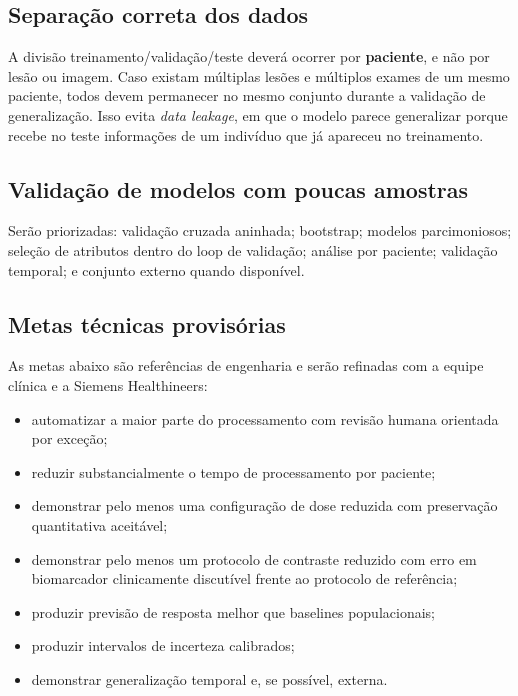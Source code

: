 \documentclass[11pt,a4paper]{article}
\begin{document}
\subsection{Separação correta dos dados}

A divisão treinamento/validação/teste deverá ocorrer por \textbf{paciente}, e não por lesão ou imagem. Caso existam múltiplas lesões e múltiplos exames de um mesmo paciente, todos devem permanecer no mesmo conjunto durante a validação de generalização. Isso evita \emph{data leakage}, em que o modelo parece generalizar porque recebe no teste informações de um indivíduo que já apareceu no treinamento.

\subsection{Validação de modelos com poucas amostras}

Serão priorizadas: validação cruzada aninhada; bootstrap; modelos parcimoniosos; seleção de atributos dentro do loop de validação; análise por paciente; validação temporal; e conjunto externo quando disponível.

\subsection{Metas técnicas provisórias}

As metas abaixo são referências de engenharia e serão refinadas com a equipe clínica e a Siemens Healthineers:

\begin{itemize}
\item automatizar a maior parte do processamento com revisão humana orientada por exceção;
\item reduzir substancialmente o tempo de processamento por paciente;
\item demonstrar pelo menos uma configuração de dose reduzida com preservação quantitativa aceitável;
\item demonstrar pelo menos um protocolo de contraste reduzido com erro em biomarcador clinicamente discutível frente ao protocolo de referência;
\item produzir previsão de resposta melhor que baselines populacionais;
\item produzir intervalos de incerteza calibrados;
\item demonstrar generalização temporal e, se possível, externa.
\end{itemize}
\end{document}
